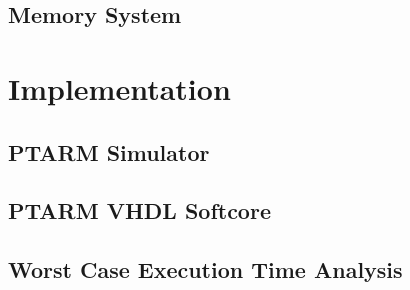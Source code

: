 \subsection{Memory System}
\label{subsection:memory_system}


\section{Implementation}
\subsection{PTARM Simulator}
\label{subsection:ptarm_sim}

\subsection{PTARM VHDL Softcore}
\label{subsection:ptarm_vhdl_softcore}

\subsection{Worst Case Execution Time Analysis}
\label{sec:wcet}